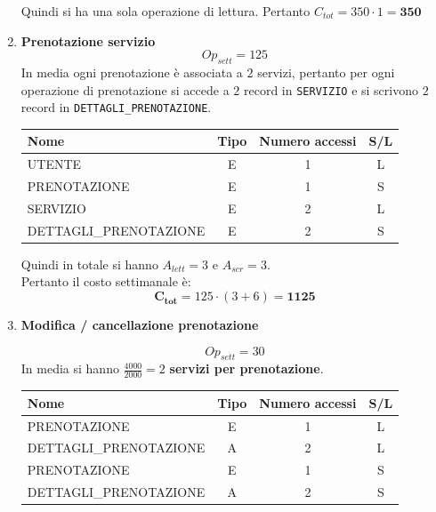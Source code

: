 \documentclass[a4paper,12pt]{report}
\begin{document}
\begin{enumerate}
    Quindi si ha una sola operazione di lettura.
    Pertanto $C_{tot} = 350 \cdot 1 = \mathbf{350}$
	
    \item {\large \textbf{Prenotazione servizio}} \label{op3}
    $$
    {Op}_{sett}=125
    $$
	In media ogni prenotazione è associata a $2$ servizi, 
	pertanto per ogni operazione di prenotazione si accede a $2$ record in \texttt{SERVIZIO} 
	e si scrivono $2$ record in \texttt{DETTAGLI\_PRENOTAZIONE}.
    
    \begin{table}[H]
    \centering
    \small
    \renewcommand{\arraystretch}{1.15}
    \begin{tabularx}{0.8\textwidth}{|X|c|c|c|}
        \hline
        \rowcolor{gray!20}
        \textbf{Nome} & \textbf{Tipo} & \textbf{Numero accessi} & \textbf{S/L} \\
        \hline
        UTENTE & E & 1 & L \\
        PRENOTAZIONE & E & 1 & S\\
        SERVIZIO & E & 2  & L \\
        DETTAGLI\_PRENOTAZIONE & E & 2 & S\\
        \hline
    \end{tabularx}
	\end{table}
    
    Quindi in totale si hanno $A_{lett}=3$ e $A_{scr}=3$. \\
    Pertanto il costo settimanale è:
    $$\mathbf{C_{tot}} = 125 \cdot (3+6)=\mathbf{1125}$$ 
    
    
    
	\item {\large \textbf{Modifica / cancellazione prenotazione}} \label{op4}
    
    $$
    {Op}_{sett} = 30
    $$
    In media si hanno $\frac{4000}{2000}=2$ \textbf{servizi per prenotazione}.
    
    \begin{table}[H]
    \centering
    \small
    \renewcommand{\arraystretch}{1.15}
    \begin{tabularx}{0.8\textwidth}{|X|c|c|c|}
        \hline
        \rowcolor{gray!20}
        \textbf{Nome} & \textbf{Tipo} & \textbf{Numero accessi} & \textbf{S/L} \\
        \hline
        PRENOTAZIONE & E & 1 & L \\
        DETTAGLI\_PRENOTAZIONE & A & 2 & L\\
        PRENOTAZIONE & E & 1 & S \\
        DETTAGLI\_PRENOTAZIONE & A & 2 & S\\
        \hline
    \end{tabularx}
	\end{table}
    

\end{enumerate}
\end{document}
